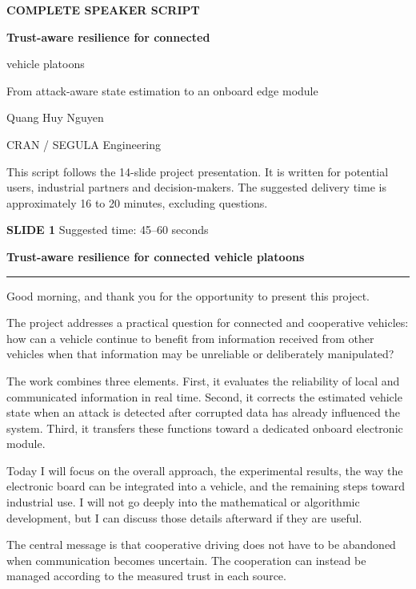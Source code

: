 \documentclass[11pt,a4paper]{article}
\newcommand{\slidetitle}[3]{%
  \clearpage
  {\color{Accent}\large\bfseries SLIDE #1}\hfill
  {\color{Muted}\small Suggested time: #3}\par
  \vspace{0.18cm}
  {\LARGE\bfseries #2}\par
  \vspace{0.20cm}
  {\color{Muted}\rule{\textwidth}{0.5pt}}\par
  \vspace{0.12cm}
}
\begin{document}
\begin{titlepage}
  \vspace*{2.0cm}
  {\color{Accent}\large\bfseries COMPLETE SPEAKER SCRIPT}\par
  \vspace{0.35cm}
  {\Huge\bfseries Trust-aware resilience for connected\par vehicle platoons}\par
  \vspace{0.45cm}
  {\Large\color{Muted}From attack-aware state estimation to an onboard edge module}\par
  \vspace{1.1cm}
  {\large Quang Huy Nguyen}\par
  \vspace{0.15cm}
  {\color{Muted}CRAN / SEGULA Engineering}\par
  \vfill
  \colorbox{Panel}{%
    \parbox{\dimexpr\textwidth-2\fboxsep\relax}{%
      \raggedright This script follows the 14-slide project presentation. It is written for potential users, industrial partners and decision-makers. The suggested delivery time is approximately 16 to 20 minutes, excluding questions.}}
\end{titlepage}

\slidetitle{1}{Trust-aware resilience for connected vehicle platoons}{45--60 seconds}

Good morning, and thank you for the opportunity to present this project.

The project addresses a practical question for connected and cooperative vehicles: how can a vehicle continue to benefit from information received from other vehicles when that information may be unreliable or deliberately manipulated?

The work combines three elements. First, it evaluates the reliability of local and communicated information in real time. Second, it corrects the estimated vehicle state when an attack is detected after corrupted data has already influenced the system. Third, it transfers these functions toward a dedicated onboard electronic module.

Today I will focus on the overall approach, the experimental results, the way the electronic board can be integrated into a vehicle, and the remaining steps toward industrial use. I will not go deeply into the mathematical or algorithmic development, but I can discuss those details afterward if they are useful.

The central message is that cooperative driving does not have to be abandoned when communication becomes uncertain. The cooperation can instead be managed according to the measured trust in each source.
\end{document}
